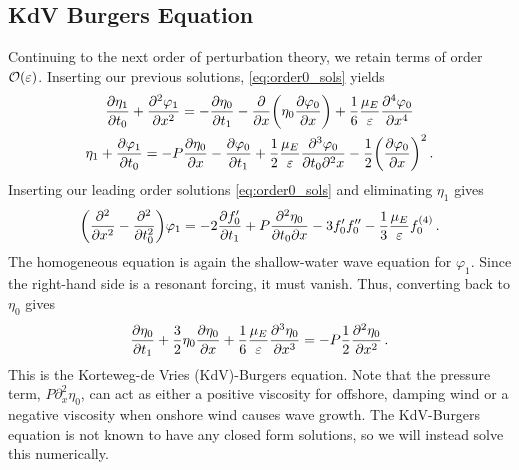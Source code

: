 \documentclass{jfm}
\renewcommand*{\epsilon}{\varepsilon}
\begin{document}
\subsection{\label{sec:int_first_order} KdV Burgers Equation}
Continuing to the next order of perturbation theory, we retain terms of
order $\order{\epsilon}$.
Inserting our previous solutions, \cref{eq:order0_sols} yields
\begin{gather}
    \pdv{\eta_1}{t_0} + \pdv[2]{\varphi_{1}}{x} =
      -\pdv{\eta_0}{t_1} - \pdv{x} \pqty{\eta_0 \pdv{\varphi_0}{x}} +
      \frac{1}{6} \frac{\mu_E}{\epsilon} \pdv[4]{\varphi_0}{x}
  \\
    \eta_1 + \pdv{\varphi_1}{t_0} = -P \pdv{\eta_0}{x} -\pdv{\varphi_0}{t_1}
      + \frac{1}{2} \frac{\mu_E}{\epsilon} \frac{\partial^3 \varphi_0}
        {\partial t_0 \partial^2 x}
      - \frac{1}{2} \pqty{ \pdv{\varphi_0}{x} }^2
  \,.
\end{gather}
Inserting our leading order solutions \cref{eq:order0_sols} and
eliminating $\eta_1$ gives
\begin{equation}
  \pqty{\pdv[2]{x} - \pdv[2]{t_0}} \varphi_1 = -2 \pdv{f_0'}{t_1} +
    P\pdv{\eta_0}{t_0}{x} - 3 f_0' f_0'' - \frac{1}{3} \frac{\mu_E}{\epsilon}
    f_0^{(4)} \,.
\end{equation}
The homogeneous equation is again the shallow-water wave equation for
$\varphi_1$.
Since the right-hand side is a resonant forcing, it must vanish.
Thus, converting back to $\eta_0$ gives
\begin{equation}
  \pdv{\eta_0}{t_1} + \frac{3}{2}
    \eta_0 \pdv{\eta_0}{x} + \frac{1}{6} \frac{\mu_E}{\epsilon}
    \pdv[3]{\eta_0}{x} = -P \frac{1}{2} \pdv[2]{\eta_0}{x} \,.
  \label{eq:kdv_burgers}
\end{equation}
This is the Korteweg-de Vries (KdV)-Burgers equation.
Note that the pressure term, $P \partial^2_x \eta_0$, can act as either
a positive viscosity for offshore, damping wind or a negative viscosity
when onshore wind causes wave growth.
The KdV-Burgers equation is not known to have any closed form solutions,
so we will instead solve this numerically.
\end{document}
